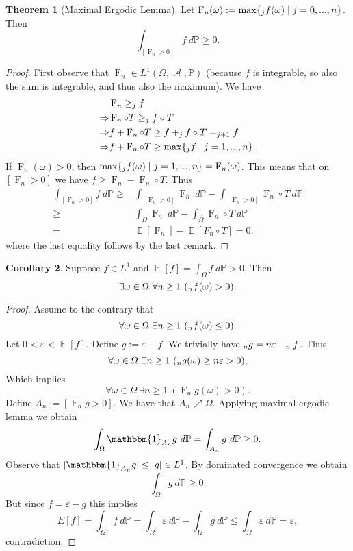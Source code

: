 \documentclass[12pt,a4paper]{report}
\theoremstyle{definition}
\newtheorem{theorem}{Theorem}[chapter] %
\newtheorem{corollary}[theorem]{Corollary} %
\theoremstyle{num.custom-title}
\DeclareMathOperator{\A}{\mathcal{A}}
\DeclareMathOperator{\E}{\mathbb{E}}
\DeclareMathOperator{\imp}{\Rightarrow}
\let\S\relax %
\DeclareMathOperator{\S}{S}
\newcommand{\F}{\mathcal{F}}
\renewcommand{\epsilon}{\varepsilon}
\renewcommand{\1}{\mathbbm{1}}
\renewcommand{\P}{\mathbb{P}}
\begin{document}
\begin{theorem}[Maximal Ergodic Lemma]
\renewcommand{\F}{\operatorname{F}}
Let $\F_n(\omega) := \max\{\S_j f(\omega) \mid j = 0,...,n\}$. Then
\[
\int_{[\F_n > 0]} f \ d\P \geq 0.
\]
\begin{proof}
First observe that $\F_n \in L^1(\Omega,\A,\P)$ (because $f$ is integrable, so also the sum is integrable, and thus also the maximum). We have
\begin{align*}
& \F_n \geq \S_j f \\
\imp & \F_n \circ T \geq \S_j f \circ T \\
\imp & f + \F_n \circ T \geq f + \S_j f \circ T = \S_{j+1} f \\
\imp & f + \F_n \circ T \geq \max\{\S_j f \mid j = 1,...,n\}.
\end{align*}
If $\F_n(\omega)>0$, then $\max\{\S_j f(\omega) \mid j = 1,...,n\} = \F_n(\omega)$. This means that on $[\F_n>0]$ we have $f \geq \F_n - \F_n \circ T$. Thus
\begin{align*}
\int_{[\F_n>0]} f \ d\P 
\geq & \int_{[\F_n>0]} \F_n \ d\P - \int_{[\F_n>0]} \F_n \circ T \ d\P \\
\geq & \int_\Omega \F_n \ d\P - \int_\Omega \F_n \circ T \ d\P \\
= & \E[\F_n] - \E[F_n \circ T] = 0,
\end{align*}
where the last equality follows by the last remark.
\end{proof}
\end{theorem}

\begin{corollary}\label{corollary-time_average_positive}
\renewcommand{\F}{\operatorname{F}}
Suppose $f \in L^1$ and $\E[f] = \int_\Omega f \ d\P > 0$. Then 
\[
\exists \omega \in \Omega \ \forall n \geq 1 \ (\S_n f(\omega) > 0).
\]
\begin{proof}
Assume to the contrary that
\[
\forall \omega \in \Omega \ \exists n \geq 1 \ (\S_n f(\omega) \leq 0).
\]
Let $0 < \epsilon < \E[f]$. Define $g := \epsilon - f$. We trivially have $\S_n g = n\epsilon - \S_n f$. Thus
\[
\forall \omega \in \Omega \ \exists n \geq 1 \ (\S_n g(\omega) \geq n\epsilon >0),
\]
Which implies 
\[
\forall \omega \in \Omega \ \exists n \geq 1 \ (\F_n g(\omega)>0).
\]
Define $A_n := [\F_n g >0]$. We have that $A_n \nearrow \Omega$. Applying maximal ergodic lemma we obtain
\[
\int_\Omega \1_{A_n} g \ d\P = \int_{A_n} g \ d\P \geq 0.
\]
Observe that $|\1_{A_n} g| \leq |g| \in L^1$. By dominated convergence we obtain
\[
\int_\Omega g \ d\P \geq 0.
\]
But since $f = \epsilon - g$ this implies
\[
E[f] = \int_\Omega f \ d\P = \int_\Omega \epsilon \ d\P - \int_\Omega g \ d\P \leq \int_\Omega \epsilon \ d\P = \epsilon,
\]
contradiction.
\end{proof}
\end{corollary}
\end{document}
